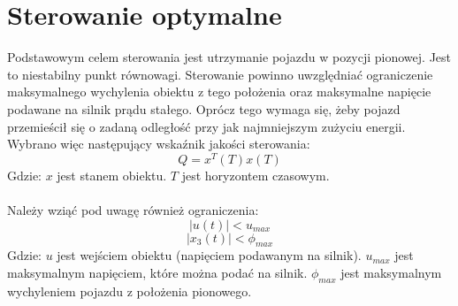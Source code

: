 \section{Sterowanie optymalne}
\label{sec:sterowanie_optymalne}

Podstawowym celem sterowania jest utrzymanie pojazdu w pozycji pionowej. Jest to niestabilny punkt równowagi. Sterowanie powinno uwzględniać ograniczenie maksymalnego wychylenia obiektu z tego położenia oraz maksymalne napięcie podawane na silnik prądu stałego. Oprócz tego wymaga się, żeby pojazd przemieścił się o zadaną odległość przy jak najmniejszym zużyciu energii. Wybrano więc następujący wskaźnik jakości sterowania:
\begin{equation}
Q=x^T(T)x(T)
\end{equation}
\noindent Gdzie:\newline
\(x\) jest stanem obiektu.\newline
\(T\) jest horyzontem czasowym.

\paragraph*{}
Należy wziąć pod uwagę również ograniczenia:
\begin{equation}
|u(t)|< u_{max}
\label{eq:u_max}
\end{equation}
\begin{equation}
|x_3(t)|< \phi_{max}
\label{eq:phi_max}
\end{equation}
\noindent Gdzie:\newline
\(u\) jest wejściem obiektu (napięciem podawanym na silnik).\newline
\(u_{max}\) jest maksymalnym napięciem, które można podać na silnik.\newline
\(\phi_{max}\) jest maksymalnym wychyleniem pojazdu z położenia pionowego.

